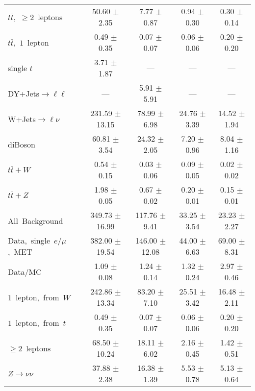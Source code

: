 \documentclass{article}
\begin{document}
\begin{longtable}{|l|c|c|c|c|}
$t\bar{t}$,~$\ge2$~leptons & 50.60 $\pm$ 2.35  & 7.77 $\pm$ 0.87  & 0.94 $\pm$ 0.30  & 0.30 $\pm$ 0.14 \\* 
$t\bar{t}$,~$1$~lepton & 0.49 $\pm$ 0.35  & 0.07 $\pm$ 0.07  & 0.06 $\pm$ 0.06  & 0.20 $\pm$ 0.20 \\* 
single $t$  & 3.71 $\pm$ 1.87  & ---  & ---  & --- \\* 
DY+Jets$\rightarrow\ell\ell$  & ---  & 5.91 $\pm$ 5.91  & ---  & --- \\* 
W+Jets$\rightarrow\ell\nu$  & 231.59 $\pm$ 13.15  & 78.99 $\pm$ 6.98  & 24.76 $\pm$ 3.39  & 14.52 $\pm$ 1.94 \\* 
diBoson  & 60.81 $\pm$ 3.54  & 24.32 $\pm$ 2.05  & 7.20 $\pm$ 0.96  & 8.04 $\pm$ 1.16 \\* 
$t\bar{t}+W$  & 0.54 $\pm$ 0.15  & 0.03 $\pm$ 0.06  & 0.09 $\pm$ 0.05  & 0.02 $\pm$ 0.02 \\* 
$t\bar{t}+Z$  & 1.98 $\pm$ 0.05  & 0.67 $\pm$ 0.02  & 0.20 $\pm$ 0.01  & 0.15 $\pm$ 0.01 \\* 
\hline \hline 
All~Background  & 349.73 $\pm$ 16.99  & 117.76 $\pm$ 9.41  & 33.25 $\pm$ 3.54  & 23.23 $\pm$ 2.27 \\* 
Data,~single~$e/\mu$,~MET  & 382.00 $\pm$ 19.54  & 146.00 $\pm$ 12.08  & 44.00 $\pm$ 6.63  & 69.00 $\pm$ 8.31 \\* 
Data/MC  & 1.09 $\pm$ 0.08  & 1.24 $\pm$ 0.14  & 1.32 $\pm$ 0.24  & 2.97 $\pm$ 0.46 \\* 
\hline \hline 
$1$~lepton,~from~$W$  & 242.86 $\pm$ 13.34  & 83.20 $\pm$ 7.10  & 25.51 $\pm$ 3.42  & 16.48 $\pm$ 2.11 \\* 
$1$~lepton,~from~$t$  & 0.49 $\pm$ 0.35  & 0.07 $\pm$ 0.07  & 0.06 $\pm$ 0.06  & 0.20 $\pm$ 0.20 \\* 
$\ge2$~leptons  & 68.50 $\pm$ 10.24  & 18.11 $\pm$ 6.02  & 2.16 $\pm$ 0.45  & 1.42 $\pm$ 0.51 \\* 
$Z\rightarrow\nu\nu$  & 37.88 $\pm$ 2.38  & 16.38 $\pm$ 1.39  & 5.53 $\pm$ 0.78  & 5.13 $\pm$ 0.64 \\* 
\hline 
\end{longtable} 

 
 
 
 
\pagebreak 

 
 
 
 
\end{document}
